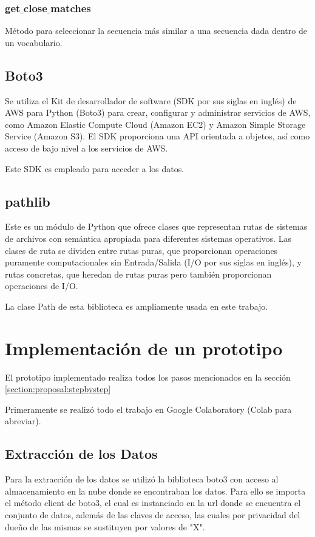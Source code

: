  \subsubsection{get$\_{}$close$\_{}$matches}
 Método para seleccionar la secuencia más similar a una secuencia dada dentro de un vocabulario.

\subsection{Boto3}
Se utiliza el Kit de desarrollador de software (SDK por sus siglas en inglés) de AWS para Python (Boto3) para crear, configurar y administrar servicios de AWS, como Amazon Elastic Compute Cloud (Amazon EC2) y Amazon Simple Storage Service (Amazon S3). El SDK proporciona una API orientada a objetos, así como acceso de bajo nivel a los servicios de AWS.

Este SDK es empleado para acceder a los datos.

\subsection{pathlib}
Este es un módulo de Python que ofrece clases que representan rutas de sistemas de archivos con semántica apropiada para diferentes sistemas operativos. Las clases de ruta se dividen entre rutas puras, que proporcionan operaciones puramente computacionales sin Entrada/Salida (I/O por sus siglas en inglés), y rutas concretas, que heredan de rutas puras pero también proporcionan operaciones de I/O.

La clase Path de esta biblioteca es ampliamente usada en este trabajo.

\section{Implementación de un prototipo}
El prototipo implementado realiza todos los pasos mencionados en la sección \ref{section:proposal:stepbystep}

Primeramente se realizó todo el trabajo en Google Colaboratory (Colab para abreviar).

\subsection{Extracción de los Datos}
Para la extracción de los datos se utilizó la biblioteca boto3 con acceso al almacenamiento en la nube donde se encontraban los datos.
Para ello se importa el método client de boto3, el cual es instanciado en la url donde se encuentra el conjunto de datos, además de las claves de acceso, las cuales por privacidad del dueño de las mismas se sustituyen por valores de "X". 

